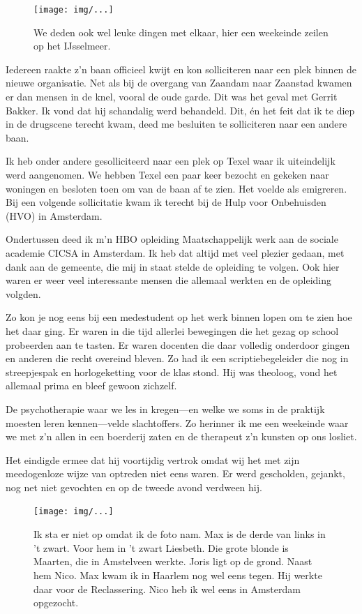 \documentclass[12pt,twoside]{memoir}
\begin{document}
\begin{figure}[t]
\texttt{[image: img/...]}
\caption{We deden ook wel leuke dingen met elkaar, hier een weekeinde zeilen op het IJsselmeer.}
\end{figure}

Iedereen raakte z’n baan officieel kwijt en kon solliciteren naar een plek binnen de nieuwe organisatie. Net als bij de overgang van Zaandam naar Zaanstad kwamen er dan mensen in de knel, vooral de oude garde. Dit was het geval met Gerrit Bakker. Ik vond dat hij schandalig werd behandeld. Dit, én het feit dat ik te diep in de drugscene terecht kwam, deed me besluiten te solliciteren naar een andere baan. 

Ik heb onder andere gesolliciteerd naar een plek op Texel waar ik uiteindelijk werd aangenomen. We hebben Texel een paar keer bezocht en gekeken naar woningen en besloten toen om van de baan af te zien. Het voelde als emigreren. Bij een volgende sollicitatie kwam ik terecht bij de Hulp voor Onbehuisden (HVO) in Amsterdam.

Ondertussen deed ik m’n HBO opleiding Maatschappelijk werk aan de sociale academie CICSA in Amsterdam. Ik heb dat altijd met veel plezier gedaan, met dank aan de gemeente, die mij in staat stelde de opleiding te volgen. Ook hier waren er weer veel interessante mensen die allemaal werkten en de opleiding volgden. 

Zo kon je nog eens bij een medestudent op het werk binnen lopen om te zien hoe het daar ging. Er waren in die tijd allerlei bewegingen die het gezag op school probeerden aan te tasten. Er waren docenten die daar volledig onderdoor gingen en anderen die recht overeind bleven. Zo had ik een scriptiebegeleider die nog in streepjespak en horlogeketting voor de klas stond. Hij was theoloog, vond het allemaal prima en bleef gewoon zichzelf. 

De psychotherapie waar we les in kregen---en welke we soms in de praktijk moesten leren kennen---velde slachtoffers. Zo herinner ik me een weekeinde waar we met z’n allen in een boerderij zaten en de therapeut z’n kunsten op ons losliet. 

Het eindigde ermee dat hij voortijdig vertrok omdat wij het met zijn meedogenloze wijze van optreden niet eens waren. Er werd gescholden, gejankt, nog net niet gevochten en op de tweede avond verdween hij.

\begin{figure}[t]
\texttt{[image: img/...]}
\caption{Ik sta er niet op omdat ik de foto nam. Max is de derde van links in ’t zwart. Voor hem in ’t zwart Liesbeth. Die grote blonde is Maarten, die in Amstelveen werkte. Joris ligt op de grond. Naast hem Nico. Max kwam ik in Haarlem nog wel eens tegen. Hij werkte daar voor de Reclassering. Nico heb ik wel eens in Amsterdam opgezocht.}
\end{figure}
\end{document}
